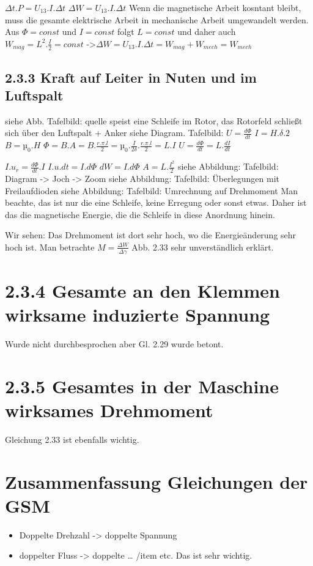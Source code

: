 \documentclass[a4paper]{article}
\begin{document}
$\Delta t . P=U_{13}.I.\Delta t$
$\Delta W = U_{13}.I.\Delta t$
Wenn die magnetische Arbeit kosntant bleibt, muss die gesamte elektrische Arbeit in mechanische Arbeit umgewandelt werden.
Aus $\Phi = const$ und $I =const$ folgt  $L=const$ und daher auch  $W_{mag}=L^2.\frac{I}{2}=const$ 
->$\Delta W=U_{13}.I.\Delta t = W_{mag} + W_{mech} = W_{mech}$

\subsection*{2.3.3 Kraft auf Leiter in Nuten und im Luftspalt}
siehe Abb. Tafelbild: quelle speist eine Schleife im Rotor, das Rotorfeld schließt sich über den Luftspalt + Anker
siehe Diagram. Tafelbild: 
$U=\frac{d\Phi}{dt}$ 
$I=H.\delta .2$
 $B=µ_0.H$
  $\Phi=B.A=B.\frac{r.\pi.l}{2}=µ_0.\frac{I}{2\delta}.\frac{r.\pi.l}{2}=L.I$ 
  $U=\frac{d\Phi}{dt}=L.\frac{dI}{dt}$ 

$I.u_r=\frac{d\Phi}{dt}.I$ 
$I.u.dt=I.d\Phi$ 
$dW=I.d\Phi$
 $A=L.\frac{I^2}{2}$ 
 siehe Abbildung: Tafelbild: Diagram -> Joch -> Zoom
siehe Abbildung: Tafelbild: Überlegungen mit Freilaufdioden
siehe Abbildung: Tafelbild: Umrechnung auf Drehmoment
Man beachte, das ist nur die eine Schleife, keine Erregung oder sonst etwas. Daher ist das die magnetische Energie, die die Schleife in diese Anordnung hinein.

Wir sehen: Das Drehmoment ist dort sehr hoch, wo die Energieänderung sehr hoch ist. Man betrachte $M=\frac{\Delta W}{\Delta \gamma}$
Abb. 2.33 sehr unverständlich erklärt.

\section*{2.3.4 Gesamte an den Klemmen wirksame induzierte Spannung}
Wurde nicht durchbesprochen aber Gl. 2.29 wurde betont.

\section*{2.3.5  Gesamtes in der Maschine wirksames Drehmoment}
Gleichung 2.33 ist ebenfalls wichtig.

\section*{Zusammenfassung Gleichungen der GSM}
\begin{itemize}
    \item Doppelte Drehzahl -> doppelte Spannung
    \item doppelter Fluss -> doppelte \ldots
    /item etc.
Das ist sehr wichtig.
\end{itemize}
\end{document}
